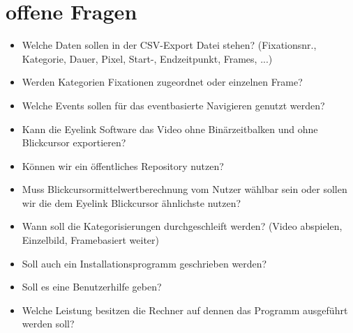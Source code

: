 \documentclass[a4paper]{scrartcl}
\begin{document}
\section{offene Fragen}
  \begin{itemize}
    \item Welche Daten sollen in der CSV-Export Datei stehen? (Fixationsnr., Kategorie, Dauer, Pixel, Start-, Endzeitpunkt, Frames, ...)
    \item Werden Kategorien Fixationen zugeordnet oder einzelnen Frame?
    \item Welche Events sollen für das eventbasierte Navigieren genutzt werden?
    \item Kann die Eyelink Software das Video ohne Binärzeitbalken und ohne Blickcursor exportieren?
    \item Können wir ein öffentliches Repository nutzen?
    \item Muss Blickcursormittelwertberechnung vom Nutzer wählbar sein oder sollen wir die dem Eyelink Blickcursor ähnlichste nutzen?
    \item Wann soll die Kategorisierungen durchgeschleift werden? (Video abspielen, Einzelbild, Framebasiert weiter)
    \item Soll auch ein Installationsprogramm geschrieben werden?
    \item Soll es eine Benutzerhilfe geben?
    \item Welche Leistung besitzen die Rechner auf dennen das Programm ausgeführt werden soll?
  \end{itemize}
\end{document}
